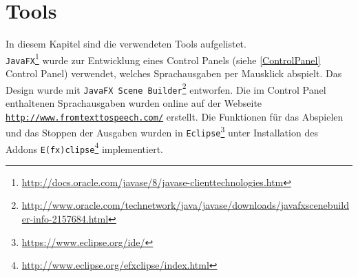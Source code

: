 \documentclass[12pt,a4paper]{scrartcl}
\begin{document}

\section{Tools}
In diesem Kapitel sind die verwendeten Tools aufgelistet. \\
\texttt{JavaFX}\footnote{\label{foot:javafx}\url{http://docs.oracle.com/javase/8/javase-clienttechnologies.htm}} wurde zur Entwicklung eines Control Panels (siehe \ref{ControlPanel} Control Panel) verwendet, welches Sprachausgaben per Mausklick abspielt. Das Design wurde mit \texttt{JavaFX Scene Builder}\footnote{\label{foot:javafxsb}\url{
http://www.oracle.com/technetwork/java/javase/downloads/javafxscenebuilder-info-2157684.html}} entworfen. Die im Control Panel enthaltenen Sprachausgaben wurden online auf der Webseite \texttt{\url{http://www.fromtexttospeech.com/}} erstellt. 
Die Funktionen für das Abspielen und das Stoppen der Ausgaben wurden in \texttt{Eclipse}\footnote{\label{foot:eclipse}\url{
https://www.eclipse.org/ide/}} unter Installation des Addons \texttt{E(fx)clipse}\footnote{\label{foot:efxclipse}\url{
http://www.eclipse.org/efxclipse/index.html}} implementiert. \\
\end{document}
